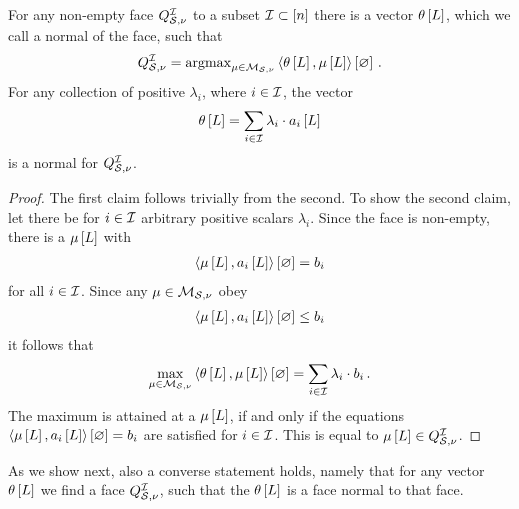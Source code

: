 \begin{lemma}
    For any non-empty face $Q^{\mathcal{I}}_{\mathcal{S},\nu}$ to a subset $\mathcal{I}\subset[n]$ there is a vector $\theta\left[L\right]$, which we call a normal of the face, such that
    \begin{align*}
        Q^{\mathcal{I}}_{\mathcal{S},\nu} = \mathrm{argmax}_{\mu\in\mathcal{M}_{\mathcal{S},\nu}}\left\langle \theta\left[L\right],\mu\left[L\right]\right\rangle \left[ \varnothing \right]  \, .
    \end{align*}
    For any collection of positive $\lambda_i$, where $i\in\mathcal{I}$, the vector
    \begin{align*}
        \theta\left[L\right] = \sum_{i\in\mathcal{I}} \lambda_i\cdot a_{i}\left[L\right]
    \end{align*}
    is a normal for $Q^{\mathcal{I}}_{\mathcal{S},\nu}$.
\end{lemma}
\begin{proof}
    The first claim follows trivially from the second.
    To show the second claim, let there be for $i\in\mathcal{I}$ arbitrary positive scalars $\lambda_i$.
    Since the face is non-empty, there is a $\mu\left[L\right]$ with
    \begin{align*}
        \left\langle \mu\left[L\right],a_{i}\left[L\right]\right\rangle \left[ \varnothing \right]=b_{i}
    \end{align*}
    for all $i\in\mathcal{I}$.
    Since any $\mu\in\mathcal{M}_{\mathcal{S},\nu}$ obey
    \begin{align*}
        \left\langle \mu\left[L\right],a_{i}\left[L\right]\right\rangle \left[ \varnothing \right]\leq b_{i}
    \end{align*}
    it follows that
    \begin{align*}
        \max_{\mu\in\mathcal{M}_{\mathcal{S},\nu}} \left\langle \theta\left[L\right],\mu\left[L\right]\right\rangle \left[ \varnothing \right]
        = \sum_{i\in\mathcal{I}} \lambda_i \cdot b_{i} \, .
    \end{align*}
    The maximum is attained at a $\mu\left[L\right]$, if and only if the equations $\left\langle \mu\left[L\right],a_{i}\left[L\right]\right\rangle \left[ \varnothing \right]=b_{i}$ are satisfied for $i\in\mathcal{I}$.
    This is equal to $\mu\left[L\right]\in Q^{\mathcal{I}}_{\mathcal{S},\nu}$.
\end{proof}

As we show next, also a converse statement holds, namely that for any vector $\theta\left[L\right]$ we find a face $Q^{\mathcal{I}}_{\mathcal{S},\nu}$, such that the $\theta\left[L\right]$ is a face normal to that face.

